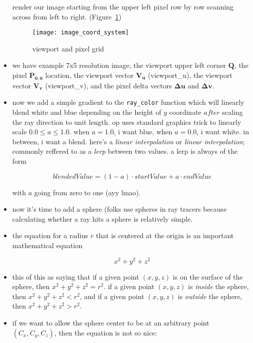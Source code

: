 \begin{itemize}
        render our image starting from the upper left pixel row by row scanning
        across from left to right. (Figure~\ref{fig:image_coord_system})
        \begin{figure}[ht]
            \centering
            \texttt{[image: image\_coord\_system]}
            \captionsetup{labelfont=bf, textfont=it}
            \caption{viewport and pixel grid}
            \label{fig:image_coord_system}
        \end{figure}
    \item we have example 7x5 resolution image, the viewport upper left corner
        $\mathbf{Q}$, the pixel $\mathbf{P_{0,0}}$ location, the viewport vector
        $\mathbf{V_{u}}$ (viewport_u), the viewport vector $\mathbf{V_{v}}$
        (viewport_v), and the pixel delta vectors $\mathbf{\Delta u}$ and 
        $\mathbf{\Delta v}$.
    \item now we add a simple gradient to the \texttt{ray_color} function which
        will linearly blend white and blue depending on the height of $y$
        coordinate $after$ scaling the ray direction to unit length. op uses
        standard graphics trick to linearly scale $0.0 \leq a \leq 1.0$. when
        $a=1.0$, i want blue, when $a=0.0$, i want white. in between, i want a
        blend. here's a \textit{linear interpolation} or \textit{linear
        interpolation}; commonly reffered to as a \textit{lerp} between two
        values. a lerp is always of the form 

        \begin{equation}
            blendedValue = (1-a)\cdot startValue + a \cdot endValue
        \end{equation}

        with $a$ going from zero to one (ayy lmao).
    \item now it's time to add a sphere (folks use spheres in ray tracers
        because calculating whether a ray hits a sphere is relatively simple.
    \item the equation for a radius $r$ that is centered at the origin is an
        important mathematical equation

        \begin{equation}
            x^{2}+y^{2}+z^{2}
        \end{equation}

    \item this of this as saying that if a given point $(x,y,z)$ is on the
        surface of the sphere, then $x^{2}+y^{2}+z^{2}=r^{2}$. if a given point
        $(x,y,z)$ is \textit{inside} the sphere, then $x^{2}+y^{2}+z^{2}<r^{2}$,
        and if a given point $(x,y,z)$ is \textit{outside} the sphere, then
        $x^{2}+y^{2}+z^{2}>r^{2}$.
    \item if we want to allow the sphere center to be at an arbitrary point 
        $(C_{x},C_{y},C_{z})$, then the equation is not so nice:


\end{itemize}

